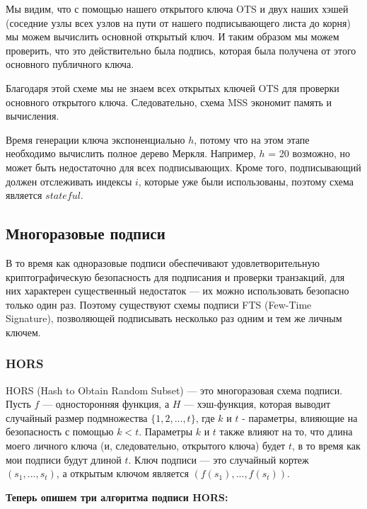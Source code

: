 \documentclass[a4paper, 14pt]{extarticle}
\begin{document}
Мы видим, что с помощью нашего открытого ключа OTS и двух наших хэшей (соседние узлы всех узлов на пути от нашего подписывающего листа до корня) мы можем вычислить основной открытый ключ. И таким образом мы можем проверить, что это действительно была подпись, которая была получена от этого основного публичного ключа.

Благодаря этой схеме мы не знаем всех открытых ключей OTS для проверки основного открытого ключа. Следовательно, схема MSS экономит память и вычисления.

Время генерации ключа экспоненциально $h$, потому что на этом этапе необходимо вычислить полное дерево Меркля. Например, $h$ = 20 возможно, но может быть недостаточно для всех подписывающих. Кроме того, подписывающий должен отслеживать индексы $i$, которые уже были использованы, поэтому схема является $stateful$.
\newpage

\subsection{Многоразовые подписи}
В то время как одноразовые подписи обеспечивают удовлетворительную криптографическую безопасность для подписания и проверки транзакций, для них характерен существенный недостаток --- их можно использовать безопасно только один раз. Поэтому существуют схемы подписи FTS (Few-Time Signature), позволяющей подписывать несколько раз одним и тем же личным ключем.
\subsubsection{HORS}
HORS (Hash to Obtain Random Subset) --- это многоразовая схема подписи. Пусть $f$ --- односторонняя функция, а $H$ --- хэш-функция, которая выводит случайный размер подмножества $\{1,2,...,t\}$, где $k$ и $t$ - параметры, влияющие на безопасность с помощью $k < t$. Параметры $k$ и $t$ также влияют на то, что длина моего личного ключа (и, следовательно, открытого ключа) будет $t$, в то время как мои подписи будут длиной $t$. Ключ подписи --- это случайный кортеж $(s_1,...,s_t)$, а открытым ключом является $(f(s_{1}),..., f(s_{t}))$.
\newline

\textbf{Теперь опишем три алгоритма подписи HORS:}
\end{document}
